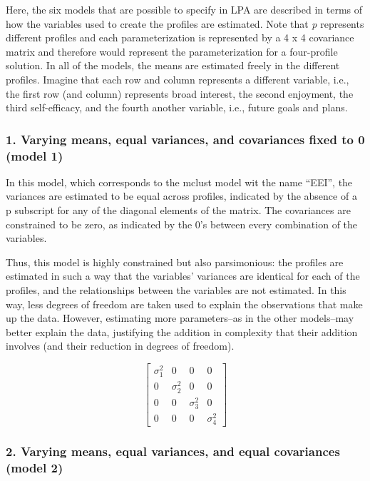 \documentclass[]{msu-thesis}
\theoremstyle{definition}
\theoremstyle{definition}
\theoremstyle{definition}
\theoremstyle{remark}
\begin{document}
Here, the six models that are possible to specify in LPA are described
in terms of how the variables used to create the profiles are estimated.
Note that \emph{p} represents different profiles and each
parameterization is represented by a 4 x 4 covariance matrix and
therefore would represent the parameterization for a four-profile
solution. In all of the models, the means are estimated freely in the
different profiles. Imagine that each row and column represents a
different variable, i.e., the first row (and column) represents broad
interest, the second enjoyment, the third self-efficacy, and the fourth
another variable, i.e., future goals and plans.

\subsubsection{1. Varying means, equal variances, and covariances fixed
to 0 (model
1)}\label{varying-means-equal-variances-and-covariances-fixed-to-0-model-1}

In this model, which corresponds to the mclust model wit the name
``EEI'', the variances are estimated to be equal across profiles,
indicated by the absence of a p subscript for any of the diagonal
elements of the matrix. The covariances are constrained to be zero, as
indicated by the 0's between every combination of the variables.

Thus, this model is highly constrained but also parsimonious: the
profiles are estimated in such a way that the variables' variances are
identical for each of the profiles, and the relationships between the
variables are not estimated. In this way, less degrees of freedom are
taken used to explain the observations that make up the data. However,
estimating more parameters--as in the other models--may better explain
the data, justifying the addition in complexity that their addition
involves (and their reduction in degrees of freedom).

\[
\left[ \begin{matrix} { \sigma  }_{ 1 }^{ 2 } & 0 & 0 & 0 \\ 0 & { \sigma  }_{ 2 }^{ 2 } & 0 & 0 \\ 0 & 0 & { \sigma  }_{ 3 }^{ 2 } & 0 \\ 0 & 0 & 0 & { \sigma  }_{ 4 }^{ 2 } \end{matrix} \right] 
\]

\subsubsection{2. Varying means, equal variances, and equal covariances
(model
2)}\label{varying-means-equal-variances-and-equal-covariances-model-2}
\end{document}
